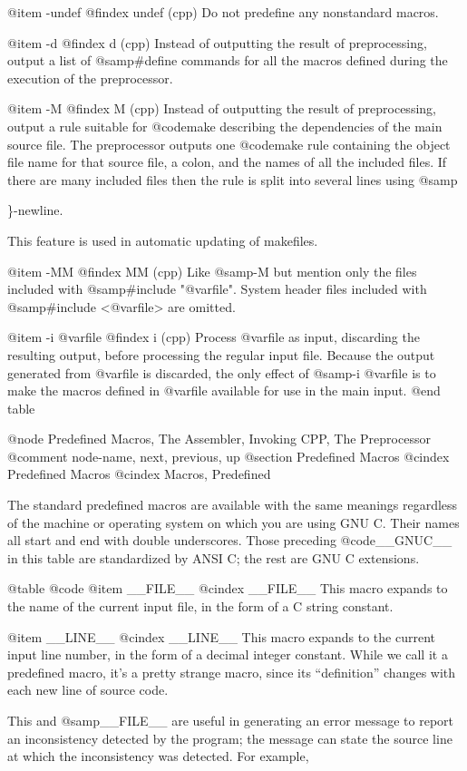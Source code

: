 {{{@item -undef
@findex undef (cpp)
Do not predefine any nonstandard macros.

@item -d
@findex d (cpp)
Instead of outputting the result of preprocessing, output a list of
@samp{#define} commands for all the macros defined during the
execution of the preprocessor.

@item -M
@findex M (cpp)
Instead of outputting the result of preprocessing, output a rule
suitable for @code{make} describing the dependencies of the main
source file.  The preprocessor outputs one @code{make} rule containing
the object file name for that source file, a colon, and the names of
all the included files.  If there are many included files then the
rule is split into several lines using @samp{\}-newline.

This feature is used in automatic updating of makefiles.

@item -MM
@findex MM (cpp)
Like @samp{-M} but mention only the files included with @samp{#include
"@var{file}"}.  System header files included with @samp{#include
<@var{file}>} are omitted.

@item -i @var{file}
@findex i (cpp)
Process @var{file} as input, discarding the resulting output, before
processing the regular input file.  Because the output generated from
@var{file} is discarded, the only effect of @samp{-i @var{file}} is to
make the macros defined in @var{file} available for use in the main
input.
@end table

@node     Predefined Macros, The Assembler, Invoking CPP, The Preprocessor
@comment  node-name,         next,          previous,    up
@section Predefined Macros
@cindex Predefined Macros
@cindex Macros, Predefined

The standard predefined macros are available with the same meanings
regardless of the machine or operating system on which you are using GNU
 C.
Their names all start and end with double underscores.  Those preceding
@code{__GNUC__} in this table are standardized by ANSI C; the rest are
GNU C extensions.

@table @code
@item __FILE__
@cindex __FILE__
This macro expands to the name of the current input file, in the form
of a C string constant.

@item __LINE__
@cindex __LINE__
This macro expands to the current input line number, in the form of a
decimal integer constant.  While we call it a predefined macro, it's
a pretty strange macro, since its ``definition'' changes with each
new line of source code.

This and @samp{__FILE__} are useful in generating an error message to
report an inconsistency detected by the program; the message can state
the source line at which the inconsistency was detected. For example,

}}}}

